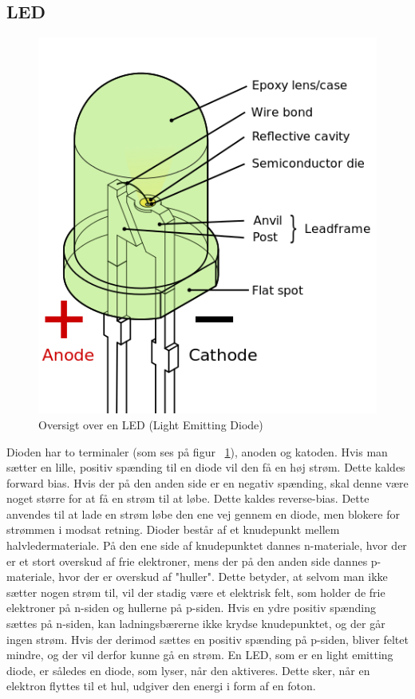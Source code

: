 \subsection{LED}
\begin{figure}[h]
	\begin{center}
	\includegraphics[scale=0.4]{Billeder/LED_Wiki.png}
	\caption[caption]{Oversigt over en LED (Light Emitting Diode)\label{fig:LED}\\\hspace{\textwidth}}
	\end{center}
\end{figure}
Dioden har to terminaler (som ses på figur ~\ref{fig:LED}), anoden og katoden. Hvis man sætter en lille, positiv spænding til en diode vil den få en høj strøm. Dette kaldes forward bias. Hvis der på den anden side er en negativ spænding, skal denne være noget større for at få en strøm til at løbe. Dette kaldes reverse-bias. Dette anvendes til at lade en strøm løbe den ene vej gennem en diode, men blokere for strømmen i modsat retning. Dioder består af et knudepunkt mellem halvledermateriale. På den ene side af knudepunktet dannes n-materiale, hvor der er et stort overskud af frie elektroner, mens der på den anden side dannes p-materiale, hvor der er overskud af "huller". Dette betyder, at selvom man ikke sætter nogen strøm til, vil der stadig være et elektrisk felt, som holder de frie elektroner på n-siden og hullerne på p-siden. Hvis en ydre positiv spænding sættes på n-siden, kan ladningsbærerne ikke krydse knudepunktet, og der går ingen strøm. Hvis der derimod sættes en positiv spænding på p-siden, bliver feltet mindre, og der vil derfor kunne gå en strøm.  
En LED, som er en light emitting diode, er således en diode, som lyser, når den aktiveres. Dette sker, når en elektron flyttes til et hul, udgiver den energi i form af en foton. 


